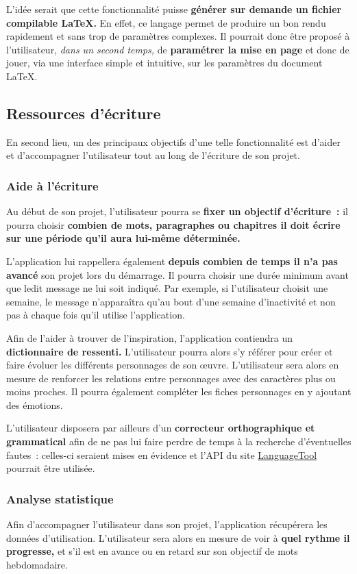 \documentclass[a4paper,11pt,twoside]{article}
\begin{document}
L'idée serait que cette fonctionnalité puisse \textbf{générer sur demande un fichier compilable \LaTeX.} En effet, ce langage permet de produire un bon rendu rapidement et sans trop de paramètres complexes. Il pourrait donc être proposé à l'utilisateur, \textit{dans un second temps,} de \textbf{paramétrer la mise en page} et donc de jouer, via une interface simple et intuitive, sur les paramètres du document \LaTeX.


\subsection{Ressources d'écriture}
En second lieu, un des principaux objectifs d'une telle fonctionnalité est d'aider et d'accompagner l'utilisateur tout au long de l'écriture de son projet.

\subsubsection{Aide à l'écriture}
Au début de son projet, l'utilisateur pourra se \textbf{fixer un objectif d'écriture~:} il pourra choisir \textbf{combien de mots, paragraphes ou chapitres il doit écrire sur une période qu'il aura lui-même déterminée.}

L'application lui rappellera également \textbf{depuis combien de temps il n'a pas avancé} son projet lors du démarrage. Il pourra choisir une durée minimum avant que ledit message ne lui soit indiqué. Par exemple, si l'utilisateur choisit une semaine, le message n'apparaîtra qu'au bout d'une semaine d'inactivité et non pas à chaque fois qu'il utilise l'application.

Afin de l'aider à trouver de l'inspiration, l'application contiendra un \textbf{dictionnaire de ressenti.} L'utilisateur pourra alors s'y référer pour créer et faire évoluer les différents personnages de son œuvre. L'utilisateur sera alors en mesure de renforcer les relations entre personnages avec des caractères plus ou moins proches. Il pourra également compléter les fiches personnages en y ajoutant des émotions.

L'utilisateur disposera par ailleurs d'un \textbf{correcteur orthographique et grammatical} afin de ne pas lui faire perdre de temps à la recherche d'éventuelles fautes~: celles-ci seraient mises en évidence et l'API du site \href{https://languagetool.org}{LanguageTool} pourrait être utilisée.

\subsubsection{Analyse statistique}
Afin d'accompagner l'utilisateur dans son projet, l'application récupérera les données d'utilisation. L'utilisateur sera alors en mesure de voir à \textbf{quel rythme il progresse,} et s'il est en avance ou en retard sur son objectif de mots hebdomadaire.
\end{document}
